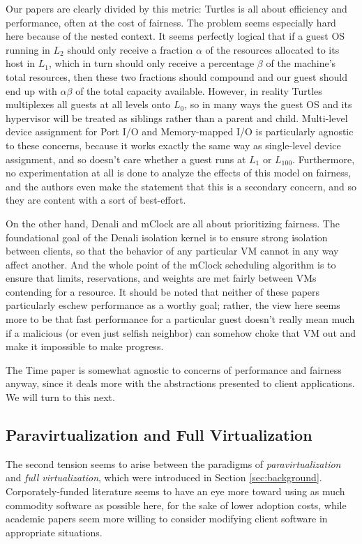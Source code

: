 \documentclass[letterpaper, twocolumn]{article}
\begin{document}
Our papers are clearly divided by this metric:  Turtles is all about efficiency
and performance, often at the cost of fairness.  The problem seems
especially hard here because of the nested context.  It seems perfectly logical that if
a guest OS running in $L_2$ should only receive a fraction $\alpha$ of the resources allocated
to its host in $L_1$, which in turn should only receive a percentage $\beta$ of the machine's
total resources, then these two fractions should compound and our guest should end up with
$\alpha\beta$ of the total capacity available.  However, in reality Turtles multiplexes
all guests at all levels onto $L_0$, so in many ways the guest OS and its hypervisor will
be treated as siblings rather than a parent and child.  Multi-level device assignment
for Port I/O and Memory-mapped I/O is particularly agnostic to these concerns, because
it works exactly the same way as single-level device assignment, and so doesn't care whether
a guest runs at $L_1$ or $L_{100}$.  Furthermore, no experimentation at all is done to analyze
the effects of this model on fairness, and the authors even make the statement that this
is a secondary concern, and so they are content with a sort of best-effort.

On the other hand, Denali and mClock are all about prioritizing fairness.  The foundational
goal of the Denali isolation kernel is to ensure strong isolation between clients, so that
the behavior of any particular VM cannot in any way affect another.  And the whole point of
the mClock scheduling algorithm is to ensure that limits, reservations, and weights
are met fairly between VMs contending for a resource.  It should be noted that neither
of these papers particularly eschew performance as a worthy goal; rather, the view
here seems more to be that fast performance for a particular guest doesn't really
mean much if a malicious (or even just selfish neighbor) can somehow choke that VM
out and make it impossible to make progress.

The Time paper is somewhat agnostic to concerns of performance and fairness anyway,
since it deals more with the abstractions presented to client applications.  We
will turn to this next.

\subsection{Paravirtualization and Full Virtualization}
\label{sec:relns/para-full}

The second tension seems to arise between the paradigms of \emph{paravirtualization}
and \emph{full virtualization}, which were introduced in Section \ref{sec:background}.
Corporately-funded literature seems to have an eye more toward using as much
commodity software as possible here, for the sake of lower adoption costs, while
academic papers seem more willing to consider modifying client software in
appropriate situations.
\end{document}
